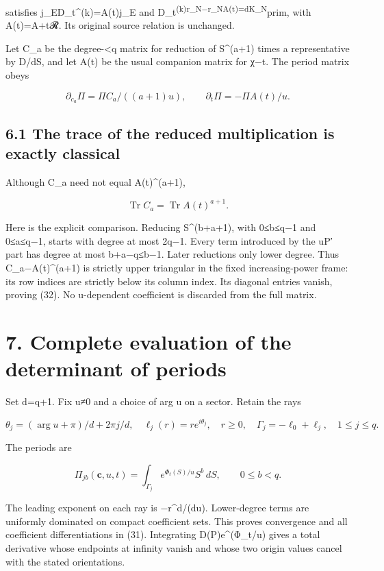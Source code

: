 \documentclass[
  11pt,
]{article}
\begin{document}
satisfies j\_ED\_t\^{}(k)=A(t)j\_E and
D\_t\textsuperscript{(k)r\_N−r\_NA(t)=dK\_N}prim, with A(t)=A+t𝓡. Its
original source relation is unchanged.

Let C\_a be the degree-\textless q matrix for reduction of S\^{}(a+1)
times a representative by D/dS, and let A(t) be the usual companion
matrix for χ−t. The period matrix obeys

\[
\partial_{c_a}\Pi=\Pi C_a/((a+1)u),
\qquad \partial_t\Pi=-\Pi A(t)/u.
\tag{31}
\]

\subsection{6.1 The trace of the reduced multiplication is exactly
classical}\label{the-trace-of-the-reduced-multiplication-is-exactly-classical}

Although C\_a need not equal A(t)\^{}(a+1),

\[
\boxed{\operatorname{Tr}C_a=\operatorname{Tr}A(t)^{a+1}.}
\tag{32}
\]

Here is the explicit comparison. Reducing S\^{}(b+a+1), with 0≤b≤q−1 and
0≤a≤q−1, starts with degree at most 2q−1. Every term introduced by the
uP′ part has degree at most b+a−q≤b−1. Later reductions only lower
degree. Thus C\_a−A(t)\^{}(a+1) is strictly upper triangular in the
fixed increasing-power frame: its row indices are strictly below its
column index. Its diagonal entries vanish, proving (32). No u-dependent
coefficient is discarded from the full matrix.

\section{7. Complete evaluation of the determinant of
periods}\label{complete-evaluation-of-the-determinant-of-periods}

Set d=q+1. Fix u≠0 and a choice of arg u on a sector. Retain the rays

\[
\theta_j=(\arg u+\pi)/d+2\pi j/d,
\quad\ell_j(r)=re^{i\theta_j},\quad r\ge0,
\quad\Gamma_j=-\ell_0+\ell_j,\quad1\le j\le q.
\tag{33}
\]

The periods are

\[
\Pi_{jb}(\mathbf c,u,t)=\int_{\Gamma_j}e^{\Phi_t(S)/u}S^b\,dS,
\qquad0\le b<q.
\tag{34}
\]

The leading exponent on each ray is −r\^{}d/(d\textbar u\textbar).
Lower-degree terms are uniformly dominated on compact coefficient sets.
This proves convergence and all coefficient differentiations in (31).
Integrating D(P)e\^{}(Φ\_t/u) gives a total derivative whose endpoints
at infinity vanish and whose two origin values cancel with the stated
orientations.
\end{document}
